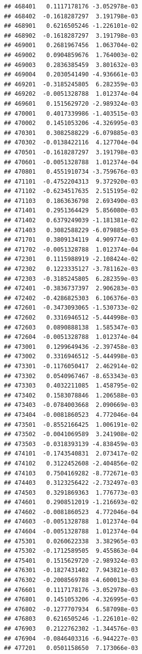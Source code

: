 \begin{frame}[fragile]
\begin{verbatim}
## 468401   0.1117178176 -3.052978e-03
## 468402  -0.1618287297  3.191798e-03
## 468901   0.6216505246 -1.226101e-02
## 468902  -0.1618287297  3.191798e-03
## 469001   0.2681967456  1.063704e-02
## 469002   0.0904859676  1.764003e-02
## 469003   0.2836385459  3.801632e-03
## 469004   0.2030541490 -4.936661e-03
## 469201  -0.3185245805  6.282359e-03
## 469202  -0.0051328788  1.012374e-04
## 469601   0.1515629720 -2.989324e-03
## 470001   0.4017339986 -1.403515e-03
## 470002   0.1451053206 -4.326995e-03
## 470301   0.3082588229 -6.079885e-03
## 470302  -0.0138422116  4.127704e-04
## 470501  -0.1618287297  3.191798e-03
## 470601  -0.0051328788  1.012374e-04
## 470801   0.4551910734 -3.759676e-03
## 471101  -0.4752204313  9.372920e-03
## 471102  -0.6234517635  2.515195e-02
## 471103   0.1863636798  2.693490e-03
## 471401   0.2951364429  5.856080e-03
## 471402   0.6379249039 -1.181381e-02
## 471403   0.3082588229 -6.079885e-03
## 471701   0.3809134119  4.909774e-03
## 471702  -0.0051328788  1.012374e-04
## 472301   0.1115988919 -2.108424e-02
## 472302   0.1223335127 -3.781162e-03
## 472303  -0.3185245805  6.282359e-03
## 472401  -0.3836737397  2.906283e-03
## 472402  -0.4286825303  6.106376e-03
## 472601  -0.3473093065 -1.530733e-02
## 472602   0.3316946512 -5.444998e-03
## 472603   0.0890888138  1.585347e-03
## 472604  -0.0051328788  1.012374e-04
## 473001   0.1299649436 -2.397458e-03
## 473002   0.3316946512 -5.444998e-03
## 473301  -0.1176050417  2.462914e-02
## 473302   0.0540967467 -8.653343e-03
## 473303   0.4032211085  1.458795e-02
## 473402   0.1583078846  1.206588e-03
## 473403  -0.0784003668  2.090669e-03
## 473404  -0.0081860523  4.772046e-04
## 473501  -0.8552166425  1.006191e-02
## 473502  -0.0041069589  3.241908e-02
## 473503  -0.0318393139 -4.838459e-03
## 474101  -0.1743540831  2.073417e-02
## 474102   0.3122452608 -2.404856e-02
## 474103   0.7504169282 -8.772671e-03
## 474403   0.3123256422 -2.732497e-03
## 474503   0.3291869363  1.776773e-03
## 474601   0.2908512019 -1.216693e-02
## 474602  -0.0081860523  4.772046e-04
## 474603  -0.0051328788  1.012374e-04
## 474604  -0.0051328788  1.012374e-04
## 475301   0.0260622338  3.382965e-03
## 475302  -0.1712589505  9.455863e-04
## 475401   0.1515629720 -2.989324e-03
## 476301  -0.1827431402  7.943821e-03
## 476302  -0.2008569788 -4.600013e-03
## 476601   0.1117178176 -3.052978e-03
## 476801   0.1451053206 -4.326995e-03
## 476802  -0.1277707934  6.587098e-03
## 476803   0.6216505246 -1.226101e-02
## 476903   0.2122762302 -1.344576e-03
## 476904  -0.0846403316 -6.944227e-03
## 477201   0.0501158650  7.173066e-03

\end{verbatim}
\end{frame}
